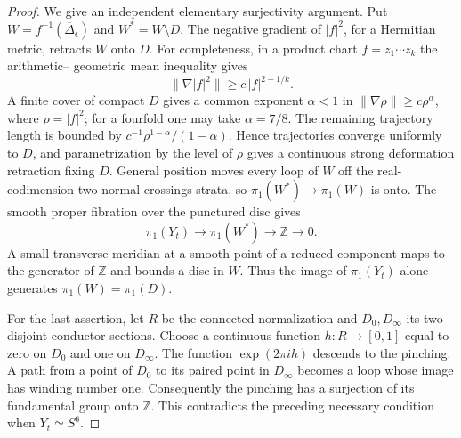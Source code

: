 \begin{proof}
We give an independent elementary
surjectivity argument. Put
$W=f^{-1}(\overline\Delta_\epsilon)$
and $W^*=W\setminus D$. The negative
gradient of $|f|^2$, for a Hermitian
metric, retracts $W$ onto $D$.
For completeness, in a product chart
$f=z_1\cdots z_k$ the arithmetic--
geometric mean inequality gives
\[
 \|\nabla |f|^2\|
   \ge c\,|f|^{2-1/k}.
\]
A finite cover of compact $D$ gives
a common exponent $\alpha<1$ in
$\|\nabla\rho\|\ge c\rho^\alpha$,
where $\rho=|f|^2$; for a fourfold
one may take $\alpha=7/8$.
The remaining trajectory length is
bounded by
$c^{-1}\rho^{1-\alpha}/(1-\alpha)$.
Hence trajectories converge uniformly
to $D$, and parametrization by the
level of $\rho$ gives a continuous
strong deformation retraction fixing
$D$. General position moves every
loop of $W$ off the real-codimension-two
normal-crossings strata, so
$\pi_1(W^*)\to\pi_1(W)$ is onto.
The smooth proper fibration over the
punctured disc gives
\[
 \pi_1(Y_t)\longrightarrow\pi_1(W^*)
       \longrightarrow\mathbb Z\longrightarrow0.
\]
A small transverse meridian at a
smooth point of a reduced component
maps to the generator of $\mathbb Z$
and bounds a disc in $W$.
Thus the image of $\pi_1(Y_t)$ alone
generates $\pi_1(W)=\pi_1(D)$.

For the last assertion, let $R$ be
the connected normalization and
$D_0,D_\infty$ its two disjoint
conductor sections. Choose a
continuous function $h:R\to[0,1]$
equal to zero on $D_0$ and one on
$D_\infty$. The function
$\exp(2\pi i h)$ descends to the
pinching. A path from a point of
$D_0$ to its paired point in
$D_\infty$ becomes a loop whose
image has winding number one.
Consequently the pinching has a
surjection of its fundamental group
onto $\mathbb Z$. This contradicts
the preceding necessary condition
when $Y_t\simeq S^6$.
\end{proof}































